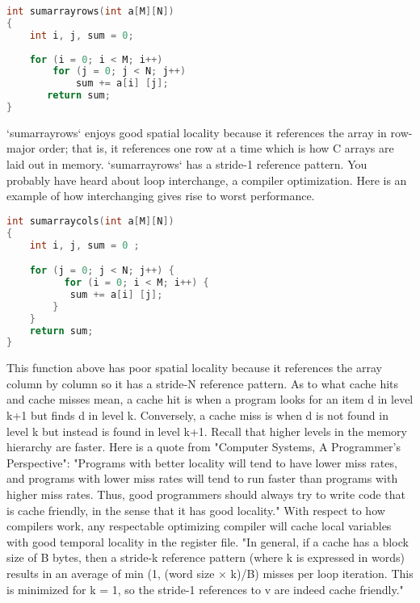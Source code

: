 \documentclass[10pt]{article}
\begin{document}
\begin{lstlisting}[language=C]
int sumarrayrows(int a[M][N])
{
	int i, j, sum = 0;
	
	for (i = 0; i < M; i++)
		for (j = 0; j < N; j++)
			sum += a[i] [j];
       return sum;
}
\end{lstlisting}
`sumarrayrows` enjoys good spatial locality because it references the array in row-major order; that is, it references one row at a time which is how C arrays are laid out in memory. `sumarrayrows` has a stride-1 reference pattern. You probably have heard about loop interchange, a compiler optimization. Here is an example of how interchanging gives rise to worst performance.

\begin{lstlisting}[language=C]
int sumarraycols(int a[M][N])
{
	int i, j, sum = 0 ;

	for (j = 0; j < N; j++) {
          for (i = 0; i < M; i++) {
	       sum += a[i] [j];
        }
    }
    return sum;
}  
\end{lstlisting}
This function above has poor spatial locality because it references the array column by column so it has a stride-N reference pattern. As to what cache hits and cache misses mean, a cache hit is when a program looks for an item d in level k+1 but finds d in level k. Conversely, a cache miss is when d is not found in level k but instead is found in level k+1. Recall that higher levels in the memory hierarchy are faster. Here is a quote from "Computer Systems, A Programmer's Perspective": "Programs with better locality will tend to have lower miss rates, and programs with lower miss rates will tend to run faster than programs with higher miss rates. Thus, good programmers should always try to write code that is cache friendly, in the sense that it has good locality." With respect to how compilers work, any respectable optimizing compiler will cache local variables with good temporal locality in the register file. "In general, if a cache has a block size of B bytes, then a stride-k reference pattern (where k is expressed in words) results in an average of min (1, (word size × k)/B) misses per loop iteration. This is minimized for k = 1, so the stride-1 references to v are indeed cache friendly."
\end{document}
